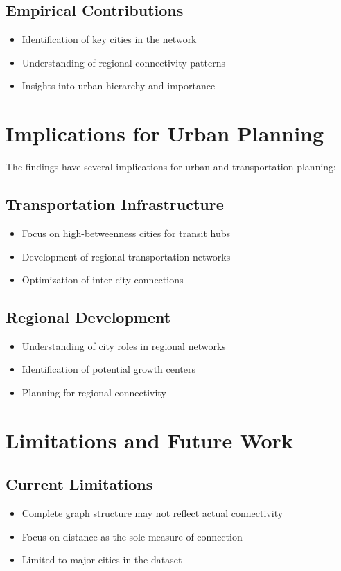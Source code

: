 \subsection{Empirical Contributions}
\begin{itemize}
    \item Identification of key cities in the network
    \item Understanding of regional connectivity patterns
    \item Insights into urban hierarchy and importance
\end{itemize}

\section{Implications for Urban Planning}
The findings have several implications for urban and transportation planning:

\subsection{Transportation Infrastructure}
\begin{itemize}
    \item Focus on high-betweenness cities for transit hubs
    \item Development of regional transportation networks
    \item Optimization of inter-city connections
\end{itemize}

\subsection{Regional Development}
\begin{itemize}
    \item Understanding of city roles in regional networks
    \item Identification of potential growth centers
    \item Planning for regional connectivity
\end{itemize}

\section{Limitations and Future Work}
\subsection{Current Limitations}
\begin{itemize}
    \item Complete graph structure may not reflect actual connectivity
    \item Focus on distance as the sole measure of connection
    \item Limited to major cities in the dataset
\end{itemize}

